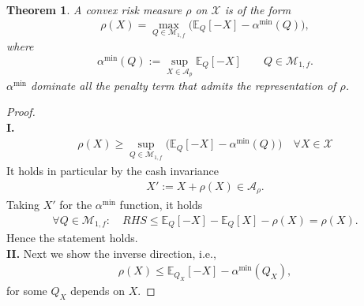 \documentclass[a4paper,11pt]{book}
\newtheorem{theorem}{Theorem}[section]
\theoremstyle{definition}
\theoremstyle{remark}
\begin{document}
\begin{theorem}
	A convex risk measure $\rho$ on $\mathcal{X}$ is of the form
	\begin{equation}
		\rho(X) = \max_{Q \in \mathcal{M}_{1, f}}  \bigg(\mathbb{E}_Q[-X] - \alpha^{\min}(Q) \bigg),
	\end{equation}
	where
	\begin{equation}
		\alpha^{\min}(Q):= \sup_{X \in \mathcal{A}_p}  \mathbb{E}_Q [-X]  \qquad Q \in \mathcal{M}_{1, f}.
	\end{equation} 
	$\alpha^{\min}$ dominate all the penalty term that admits the representation of $\rho$. 
\end{theorem}
\begin{proof}
\quad\\
\textbf{I.} 
\begin{align*}
	\rho(X) \ge \sup_{Q \in \mathcal{M}_{1, f}} \bigg( \mathbb{E}_Q[-X] - \alpha^{\min} (Q) \bigg)\quad \forall X \in \mathcal{X}
\end{align*}
It holds in particular by the cash invariance
\begin{align*}
	X':= X + \rho(X) \in \mathcal{A}_\rho.
\end{align*}
Taking $X'$ for the $\alpha^{\min}$ function, it holds
\begin{align*}
	\forall Q \in \mathcal{M}_{1, f}: \quad RHS \le  \mathbb{E}_Q[-X] - \mathbb{E}_Q[X] - \rho(X) = \rho(X).
\end{align*}
Hence the statement holds.
\quad\\
\textbf{II.} Next we show the inverse direction, i.e., 
\begin{align*}
	\rho(X) \le \mathbb{E}_{Q_X}[-X] - \alpha^{\min}(Q_X),
\end{align*}
for some $Q_X$ depends on $X$.


\end{proof}
\end{document}
